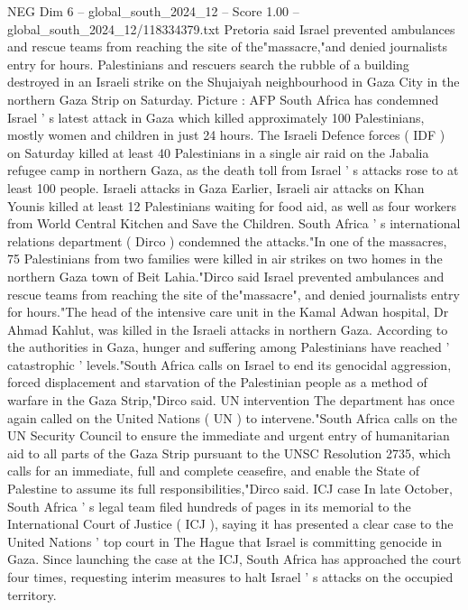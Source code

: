 \begin{textsample}{NEG Dim 6 – global\_south\_2024\_12 – Score 1.00 – global\_south\_2024\_12/118334379.txt}  \label{ex:f6_neg_122}
Pretoria said Israel prevented ambulances and rescue teams from reaching the site of the"massacre,"and denied journalists entry for hours.
Palestinians and rescuers search the rubble of a building destroyed in an Israeli strike on the Shujaiyah neighbourhood in Gaza City in the northern Gaza Strip on Saturday.
Picture : AFP South Africa has condemned Israel ' s latest attack in Gaza which killed approximately 100 Palestinians, mostly women and children in just 24 hours.
The Israeli Defence forces ( IDF ) on Saturday killed at least 40 Palestinians in a single air raid on the Jabalia refugee camp in northern Gaza, as the death toll from Israel ' s attacks rose to at least 100 people.
Israeli attacks in Gaza Earlier, Israeli air attacks on Khan Younis killed at least 12 Palestinians waiting for food aid, as well as four workers from World Central Kitchen and Save the Children.
South Africa ' s international relations department ( Dirco ) condemned the attacks."In one of the massacres, 75 Palestinians from two families were killed in air strikes on two homes in the northern Gaza town of Beit Lahia."Dirco said Israel prevented ambulances and rescue teams from reaching the site of the"massacre", and denied journalists entry for hours."The head of the intensive care unit in the Kamal Adwan hospital, Dr Ahmad Kahlut, was killed in the Israeli attacks in northern Gaza.
According to the authorities in Gaza, hunger and suffering among Palestinians have reached ' catastrophic ' levels."South Africa calls on Israel to end its genocidal aggression, forced displacement and starvation of the Palestinian people as a method of warfare in the Gaza Strip,"Dirco said.
UN intervention The department has once again called on the United Nations ( UN ) to intervene."South Africa calls on the UN Security Council to ensure the immediate and urgent entry of humanitarian aid to all parts of the Gaza Strip pursuant to the UNSC Resolution 2735, which calls for an immediate, full and complete ceasefire, and enable the State of Palestine to assume its full responsibilities,"Dirco said.
ICJ case In late October, South Africa ' s legal team filed hundreds of pages in its memorial to the International Court of Justice ( ICJ ), saying it has presented a clear case to the United Nations ' top court in The Hague that Israel is committing genocide in Gaza.
Since launching the case at the ICJ, South Africa has approached the court four times, requesting interim measures to halt Israel ' s attacks on the occupied territory.

\end{textsample}
